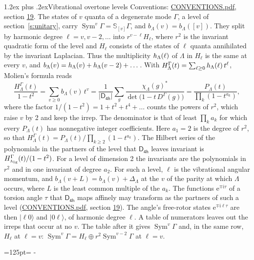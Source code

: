 \documentclass[10pt,a4paper]{article}
\makeatletter
\renewcommand\section{\@startsection{section}{1}{\z@}{-3ex plus -1ex minus -.2ex}%
  {1.2ex plus .2ex}{\normalfont\large\sffamily\bfseries\color{parttitle}}}
\newcommand{\needspace}[1]{\par\penalty-100\begingroup\dimen0=#1\relax\dimen2=\pagegoal
  \advance\dimen2-\pagetotal\ifdim\dimen0>\dimen2\relax\ifdim\dimen2>0pt\vfil\break\fi\fi
  \endgroup}
\numberwithin{equation}{section}
\newcommand{\grp}[1]{\mathsf{#1}}
\newcommand{\irr}[1]{\text{\normalfont\scshape #1}}
\newcommand{\ptag}[1]{\mathrm{#1}}
\newcommand{\iunit}{\mathrm{i}}
\newcommand{\expe}{\mathrm{e}}
\newcommand{\repD}[1]{D^{#1}}
\newcommand{\irchar}[1]{\chi_{#1}}
\newcommand{\conj}[1]{{#1}^{*}}
\newcommand{\schur}[1]{\mathbb{S}_{#1}}
\newcommand{\shape}[1]{[#1]}
\newcommand{\occ}[1]{\lvert #1\rangle}
\makeatother
\begin{document}
\section{Vibrational overtone levels}\label{s:overtones}
Conventions: \href{../../CONVENTIONS.pdf}{CONVENTIONS.pdf}, section \href{../../CONVENTIONS.pdf\#conv.19}{19}.
\leavevmode\label{n:index.quanta}\label{n:operator.symmetric.power}The states of $v$ quanta of a degenerate mode $\Gamma$, a level of section~\ref{s:unitary}, carry $\operatorname{Sym}^{v}\Gamma = \schur{\shape{v}}\Gamma$, and $b_\Lambda(v) = b_\Lambda(\shape{v})$. \label{n:local.quadratic.form}\label{n:set.harmonic}They split by harmonic degree $\ell = v, v - 2, \dots$ into $r^{v-\ell}H_\ell$, where $r^2$ is the invariant quadratic form of the level and $H_\ell$ consists of the states of $\ell$ quanta annihilated by the invariant Laplacian. \label{n:function.multiplicity.harmonic}Thus the multiplicity $\mathnormal{h}_\Lambda(\ell)$ of $\Lambda$ in $H_\ell$ is the same at every $v$, and $b_\Lambda(v) = \mathnormal{h}_\Lambda(v) + \mathnormal{h}_\Lambda(v - 2) + \dots$. \label{n:function.generating.level}With $H^{\Gamma}_\Lambda(t) = \sum_{\ell\ge0} \mathnormal{h}_\Lambda(\ell)\,t^{\ell}$, Molien's formula reads
\begin{equation}\label{e:molien}\frac{H^{\Gamma}_\Lambda(t)}{1 - t^2} = \sum_{v\ge0} b_\Lambda(v)\,t^v = \frac{1}{|\grp{D_{4h}}|}\sum_{g}\frac{\conj{\irchar{\Lambda}(g)}}{\det\bigl(1 - t\,\repD{\Gamma}(g)\bigr)} = \frac{P_\Lambda(t)}{\prod_k (1-t^{a_k})},\end{equation}
where the factor $1/(1 - t^2) = 1 + t^2 + t^4 + \dots$ counts the powers of $r^2$, which raise $v$ by 2 and keep the irrep. The denominator is that of least $\prod_k a_k$ for which every $P_\Lambda(t)$ has nonnegative integer coefficients. Here $a_1 = 2$ is the degree of $r^2$, so that $H^{\Gamma}_\Lambda(t) = P_\Lambda(t)/\prod_{k\ge2}(1 - t^{a_k})$. The Hilbert series of the polynomials in the partners of the level that $\grp{D_{4h}}$ leaves invariant is $H^{\Gamma}_{\irr{a}_{1\ptag{g}}}(t)/(1 - t^2)$. For a level of dimension 2 the invariants are the polynomials in $r^2$ and in one invariant of degree $a_2$. \label{n:index.overtone.period}\label{n:index.increment.unitary}For such a level, $\ell$ is the vibrational angular momentum, and $b_\Lambda(v + L) = b_\Lambda(v) + \Delta_\Lambda$ at the $v$ of the parity at which $\Lambda$ occurs, where $L$ is the least common multiple of the $a_k$. \label{n:local.torsion.angle}The functions $\expe^{\mp\iunit\tau}$ of a torsion angle $\tau$ that $\grp{D_{4h}}$ maps affinely may transform as the partners of such a level (\href{../../CONVENTIONS.pdf}{CONVENTIONS.pdf}, section \href{../../CONVENTIONS.pdf\#conv.19}{19}). The angle's free-rotor states $\expe^{\mp\iunit\ell\tau}$ are then $\occ{\ell 0}$ and $\occ{0 \ell}$, of harmonic degree $\ell$. A table of numerators leaves out the irreps that occur at no $v$. The table after it gives $\operatorname{Sym}^{v}\Gamma$ and, in the same row, $H_\ell$ at $\ell = v$: $\operatorname{Sym}^{v}\Gamma = H_\ell \oplus r^2\operatorname{Sym}^{v-2}\Gamma$ at $\ell = v$.
\needspace{125pt}
\end{document}

